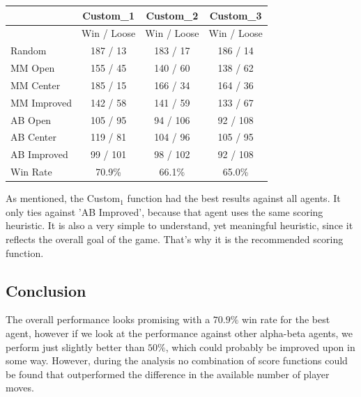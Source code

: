 \documentclass{article}
\begin{document}
\begin{center}
  \begin{tabular}{ | l || c | c | c | }
    \hline
                     & Custom_1     & Custom_2      & Custom_3    \\ \hline
                     & Win / Loose  & Win / Loose   & Win / Loose \\ \hline \hline
      Random         & 187 / 13     & 183 / 17      & 186 / 14    \\ \hline
      MM Open        & 155 / 45     & 140 / 60      & 138 / 62    \\ \hline
      MM Center      & 185 / 15     & 166 / 34      & 164 / 36    \\ \hline
      MM Improved    & 142 / 58     & 141 / 59      & 133 / 67    \\ \hline
      AB Open        & 105 / 95     & 94 / 106      & 92 / 108    \\ \hline
      AB Center      & 119 / 81     & 104 / 96      & 105 / 95    \\ \hline
      AB Improved    & 99 / 101     & 98 / 102      & 92 / 108    \\ \hline \hline
      Win Rate       & 70.9\%       & 66.1\%        & 65.0\%      \\ \hline
  \end{tabular}
\end{center}

As mentioned, the Custom$_1$ function had the best results against all agents. It only ties against
'AB Improved', because that agent uses the same scoring heuristic. It is also a very simple to understand,
yet meaningful heuristic, since it reflects the overall goal of the game.
That's why it is the recommended scoring function.

\subsection{Conclusion}
The overall performance looks promising with a $70.9\%$ win rate for the best agent,
however if we look at the performance against other alpha-beta agents, we perform
just slightly better than $50\%$, which could probably be improved upon in some way.
However, during the analysis no combination of score functions could be found that
outperformed the difference in the available number of player moves.
\end{document}

